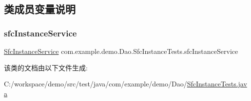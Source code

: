 \subsection{类成员变量说明}
\mbox{\label{classcom_1_1example_1_1demo_1_1_dao_1_1_sfc_instance_tests_ad412ed1fc35bbf90dcc26c9fb5cd1e73}} 
\subsubsection{\texorpdfstring{sfc\+Instance\+Service}{sfcInstanceService}}
{\footnotesize\ttfamily \mbox{\hyperlink{classcom_1_1example_1_1demo_1_1service_1_1_sfc_instance_service}{Sfc\+Instance\+Service}} com.\+example.\+demo.\+Dao.\+Sfc\+Instance\+Tests.\+sfc\+Instance\+Service\hspace{0.3cm}{\ttfamily [package]}}



该类的文档由以下文件生成\+:\begin{DoxyCompactItemize}
\item 
C\+:/workspace/demo/src/test/java/com/example/demo/\+Dao/\mbox{\hyperlink{_sfc_instance_tests_8java}{Sfc\+Instance\+Tests.\+java}}\end{DoxyCompactItemize}
